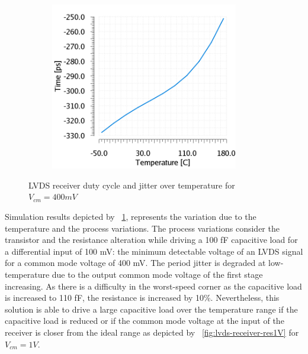 \begin{figure}[htp]
\begin{subfigure}[b]{0.32\textwidth}
        \includegraphics[width=0.9\textwidth]{Chapter5/Figs/lvds/ErrorClockPeriod.png}
    \end{subfigure}
    \caption{LVDS receiver duty cycle and jitter over temperature for $V_{cm} = 400 mV$}
    \label{fig:lvds-receiver-res}
\end{figure}

Simulation results depicted by \figurename~\ref{fig:lvds-receiver-res}, represents the variation due to the temperature and the process variations. The process variations consider the transistor and the resistance alteration while driving a 100 fF capacitive load for a differential input of 100 mV: the minimum detectable voltage of an LVDS signal for a common mode voltage of 400 mV. The period jitter is degraded at low-temperature due to the output common mode voltage of the first stage increasing. As there is a difficulty in the worst-speed corner as the capacitive load is increased to 110 fF, the resistance is increased by 10\%. Nevertheless, this solution is able to drive a large capacitive load over the temperature range if the capacitive load is reduced or if the common mode voltage at the input of the receiver is closer from the ideal range as depicted by \figurename~\ref{fig:lvds-receiver-res1V} for $V_{cm} = 1 V$.

